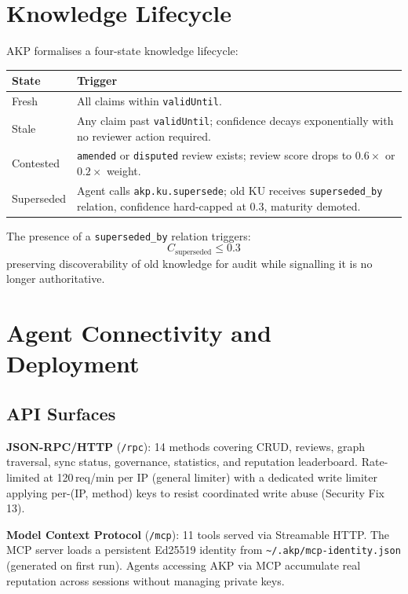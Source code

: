 \documentclass[10pt,twocolumn]{article}
\begin{document}
\section{Knowledge Lifecycle}

AKP formalises a four-state knowledge lifecycle:

\begin{center}
\small
\begin{tabular}{lp{5.0cm}}
\toprule
\textbf{State} & \textbf{Trigger} \\
\midrule
Fresh      & All claims within \texttt{validUntil}. \\
Stale      & Any claim past \texttt{validUntil}; confidence decays exponentially with no reviewer action required. \\
Contested  & \texttt{amended} or \texttt{disputed} review exists; review score drops to $0.6\times$ or $0.2\times$ weight. \\
Superseded & Agent calls \texttt{akp.ku.supersede}; old KU receives \texttt{superseded\_by} relation, confidence hard-capped at 0.3, maturity demoted. \\
\bottomrule
\end{tabular}
\end{center}

\noindent The presence of a \texttt{superseded\_by} relation triggers:
\[
  C_{\text{superseded}} \leq 0.3
\]
preserving discoverability of old knowledge for audit while signalling it is
no longer authoritative.

\section{Agent Connectivity and Deployment}

\subsection{API Surfaces}

\textbf{JSON-RPC/HTTP} (\texttt{/rpc}): 14 methods covering CRUD, reviews,
graph traversal, sync status, governance, statistics, and reputation
leaderboard. Rate-limited at 120\,req/min per IP (general limiter) with a
dedicated write limiter applying per-(IP, method) keys to resist coordinated
write abuse (Security Fix 13).

\textbf{Model Context Protocol} (\texttt{/mcp}): 11 tools served via
Streamable HTTP. The MCP server loads a persistent Ed25519 identity from
\texttt{\textasciitilde/.akp/mcp-identity.json} (generated on first run).
Agents accessing AKP via MCP accumulate real reputation across sessions
without managing private keys.
\end{document}
